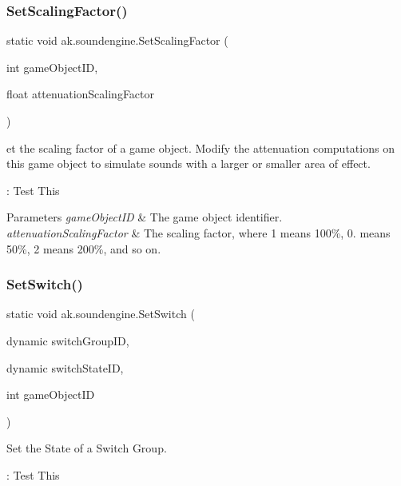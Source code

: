 \subsubsection{\texorpdfstring{Set\+Scaling\+Factor()}{SetScalingFactor()}}
{\footnotesize\ttfamily static void ak.\+soundengine.\+Set\+Scaling\+Factor (\begin{DoxyParamCaption}\item[{int}]{game\+Object\+ID,  }\item[{float}]{attenuation\+Scaling\+Factor }\end{DoxyParamCaption})\hspace{0.3cm}{\ttfamily [static]}}



et the scaling factor of a game object. Modify the attenuation computations on this game object to simulate sounds with a larger or smaller area of effect. 

\+: Test This


\begin{DoxyParams}{Parameters}
{\em game\+Object\+ID} & The game object identifier.\\
\hline
{\em attenuation\+Scaling\+Factor} & The scaling factor, where 1 means 100\%, 0. means 50\%, 2 means 200\%, and so on.\\
\hline
\end{DoxyParams}
\mbox{\label{classak_1_1soundengine_aff3bd19c1134a0ce06ef3823dbc88f86}} 
\subsubsection{\texorpdfstring{Set\+Switch()}{SetSwitch()}}
{\footnotesize\ttfamily static void ak.\+soundengine.\+Set\+Switch (\begin{DoxyParamCaption}\item[{dynamic}]{switch\+Group\+ID,  }\item[{dynamic}]{switch\+State\+ID,  }\item[{int}]{game\+Object\+ID }\end{DoxyParamCaption})\hspace{0.3cm}{\ttfamily [static]}}



Set the State of a Switch Group. 

\+: Test This


